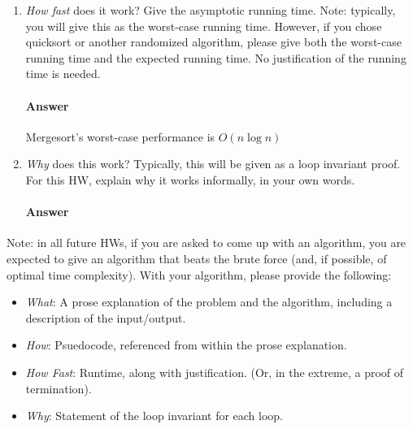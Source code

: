 \documentclass{article}
\begin{document}
\begin{enumerate}
    \item \emph{How fast} does it work?  Give the asymptotic running time.
        Note: typically, you will give this as the worst-case running time.
        However, if you chose quicksort or another randomized algorithm, please
        give both the worst-case running time and the expected running time.  No
        justification of the running time is needed.

        \paragraph{Answer}{Mergesort's worst-case performance is $O(n\log{}n)$}

    \item \emph{Why} does this work? Typically, this will be given as a loop
        invariant proof.  For this HW, explain why it works informally, in your
        own words.

        \paragraph{Answer}
        \todo{}

\end{enumerate}

Note: in all future HWs, if you are asked to come up with an algorithm, you are
expected to give an algorithm that beats the brute force (and, if possible, of
optimal time complexity). With your algorithm, please provide the following:
\begin{itemize}
    \item \emph{What}: A prose explanation of the problem and the algorithm,
        including a description of the input/output.
    \item \emph{How}: Psuedocode, referenced from within the prose explanation.
    \item \emph{How Fast}: Runtime, along with justification.  (Or, in the
        extreme, a proof of termination).
    \item \emph{Why}: Statement of the loop invariant for each loop.
\end{itemize}
\end{document}
